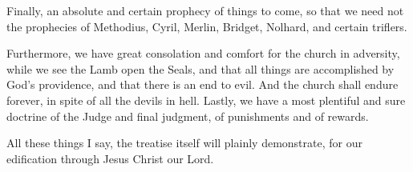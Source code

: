 Finally, an absolute and certain prophecy of things to come, so that we need not the prophecies of Methodius, Cyril, Merlin, Bridget, Nolhard, and certain triflers.

Furthermore, we have great consolation and comfort for the church in adversity, while we see the Lamb open the Seals, and that all things are accomplished by God’s providence, and that there is an end to evil. And the church shall endure forever, in spite of all the devils in hell. Lastly, we have a most plentiful and sure doctrine of the Judge and final judgment, of punishments and of rewards.

All these things I say, the treatise itself will plainly demonstrate, for our edification through Jesus Christ our Lord.
